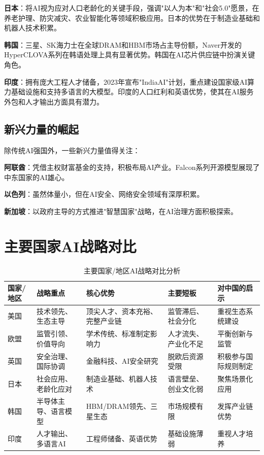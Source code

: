 \textbf{日本}：将AI视为应对人口老龄化的关键手段，强调"以人为本"和"社会5.0"愿景，在养老护理、防灾减灾、农业智能化等领域积极应用。日本的优势在于制造业基础和机器人技术积累。

\textbf{韩国}：三星、SK海力士在全球DRAM和HBM市场占主导份额，Naver开发的HyperCLOVA系列在韩语处理上具有显著优势。韩国在AI芯片供应链中扮演关键角色。

\textbf{印度}：拥有庞大工程人才储备，2023年宣布"IndiaAI"计划，重点建设国家级AI算力基础设施和支持多语言的大模型。印度的人口红利和英语优势，使其在AI服务外包和人才输出方面具有潜力。

\subsection{新兴力量的崛起}

除传统AI强国外，一些新兴力量值得关注：

\textbf{阿联酋}：凭借主权财富基金的支持，积极布局AI产业。Falcon系列开源模型展现了中东国家的AI雄心。

\textbf{以色列}：虽然体量小，但在AI安全、网络安全领域有深厚积累。

\textbf{新加坡}：以政府主导的方式推进"智慧国家"战略，在AI治理方面积极探索。

\section{主要国家AI战略对比}

\begin{table}[H]
\centering
\caption{主要国家/地区AI战略对比分析}
\small
\begin{tabular}{p{1.5cm}p{2.5cm}p{2.5cm}p{2.5cm}p{3cm}}
\toprule
\textbf{国家/地区} & \textbf{战略重点} & \textbf{核心优势} & \textbf{主要短板} & \textbf{对中国的启示} \\
\midrule
美国 & 技术领先、生态主导 & 顶尖人才、资本充裕、完整产业链 & 监管滞后、社会分化 & 重视生态系统建设 \\
欧盟 & 监管引领、价值导向 & 学术传统、标准制定影响力 & 人才流失、产业化不足 & 平衡创新与监管 \\
英国 & 安全治理、国际协调 & 金融科技、AI安全研究 & 脱欧后资源受限 & 积极参与国际规则制定 \\
日本 & 社会应用、老龄化应对 & 制造业基础、机器人技术 & 语言壁垒、创业文化弱 & 聚焦场景化应用 \\
韩国 & 半导体主导、语言模型 & HBM/DRAM领先、三星生态 & 市场规模有限 & 发挥产业链优势 \\
印度 & 人才输出、多语言AI & 工程师储备、英语优势 & 基础设施薄弱 & 重视人才培养 \\
\bottomrule
\end{tabular}
\end{table}


